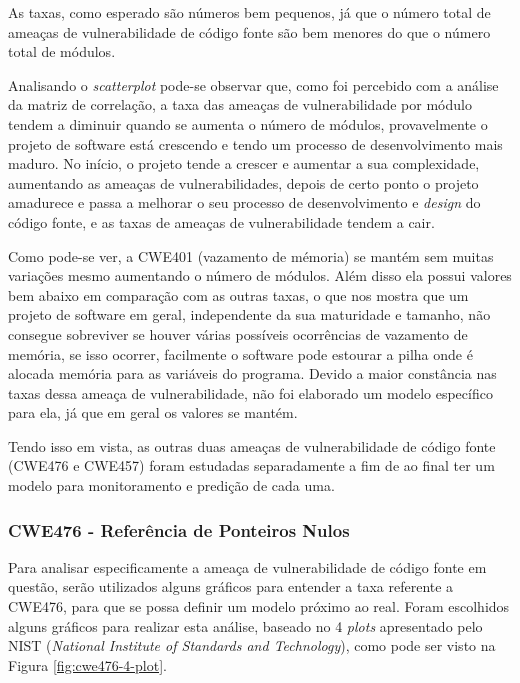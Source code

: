 As taxas, como esperado são números bem pequenos, já que o número total de
ameaças de vulnerabilidade de código fonte são bem menores do que o número total
de módulos.

Analisando o \textit{scatterplot} pode-se observar que, como foi percebido com a
análise da matriz de correlação, a taxa das ameaças de vulnerabilidade por módulo
tendem a diminuir quando se aumenta o número de módulos, provavelmente o projeto
de software está crescendo e tendo um processo de desenvolvimento mais maduro.
No início, o projeto tende a crescer e aumentar a sua complexidade, aumentando
as ameaças de vulnerabilidades, depois de certo ponto o projeto amadurece e
passa a melhorar o seu processo de desenvolvimento e \textit{design} do código
fonte, e as taxas de ameaças de vulnerabilidade tendem a cair.

Como pode-se ver, a CWE401 (vazamento de mémoria) se mantém sem muitas variações
mesmo aumentando o número de módulos. Além disso ela possui valores bem abaixo
em comparação com as outras taxas, o que nos mostra que um projeto de software
em geral, independente da sua maturidade e tamanho, não consegue sobreviver se
houver várias possíveis ocorrências de vazamento de memória, se isso ocorrer,
facilmente o software pode estourar a pilha onde é alocada memória para as
variáveis do programa. Devido a maior constância nas taxas dessa ameaça de
vulnerabilidade, não foi elaborado um modelo específico para ela, já que em
geral os valores se mantém.

Tendo isso em vista, as outras duas ameaças de vulnerabilidade de código fonte
(CWE476 e CWE457) foram estudadas separadamente a fim de ao final ter um modelo
para monitoramento e predição de cada uma.


\subsubsection{CWE476 - Referência de Ponteiros Nulos}\label{eda:cwe476}

Para analisar especificamente a ameaça de vulnerabilidade de código fonte em
questão, serão utilizados alguns gráficos para entender a taxa referente a
CWE476, para que se possa definir um modelo próximo ao real. Foram escolhidos
alguns gráficos para realizar esta análise, baseado no 4 \textit{plots}
apresentado pelo NIST (\textit{National Institute of Standards and Technology}),
como pode ser visto na Figura \ref{fig:cwe476-4-plot}.

